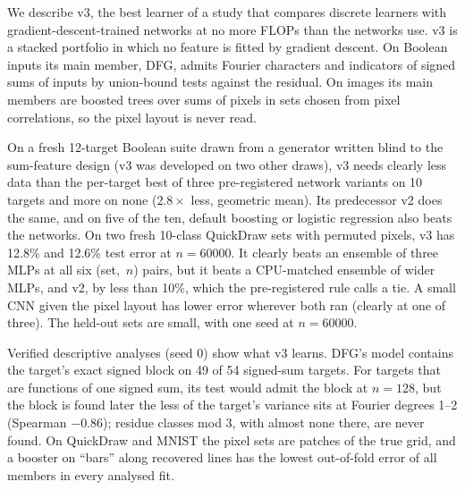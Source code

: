 \noindent
We describe v3, the best learner of a study that compares discrete learners with gradient-descent-trained networks at no more FLOPs than the networks use. v3 is a stacked portfolio in which no feature is fitted by gradient descent. On Boolean inputs its main member, DFG, admits Fourier characters and indicators of signed sums of inputs by union-bound tests against the residual. On images its main members are boosted trees over sums of pixels in sets chosen from pixel correlations, so the pixel layout is never read.

On a fresh 12-target Boolean suite drawn from a generator written blind to the sum-feature design (v3 was developed on two other draws), v3 needs clearly less data than the per-target best of three pre-registered network variants on 10 targets and more on none ($2.8\times$ less, geometric mean). Its predecessor v2 does the same, and on five of the ten, default boosting or logistic regression also beats the networks. On two fresh 10-class QuickDraw sets with permuted pixels, v3 has 12.8\% and 12.6\% test error at $n=60000$. It clearly beats an ensemble of three MLPs at all six (set,~$n$) pairs, but it beats a CPU-matched ensemble of wider MLPs, and v2, by less than 10\%, which the pre-registered rule calls a tie. A small CNN given the pixel layout has lower error wherever both ran (clearly at one of three). The held-out sets are small, with one seed at $n=60000$.

Verified descriptive analyses (seed 0) show what v3 learns. DFG's model contains the target's exact signed block on 49 of 54 signed-sum targets. For targets that are functions of one signed sum, its test would admit the block at $n=128$, but the block is found later the less of the target's variance sits at Fourier degrees 1--2 (Spearman $-0.86$); residue classes mod 3, with almost none there, are never found. On QuickDraw and MNIST the pixel sets are patches of the true grid, and a booster on ``bars'' along recovered lines has the lowest out-of-fold error of all members in every analysed fit.
